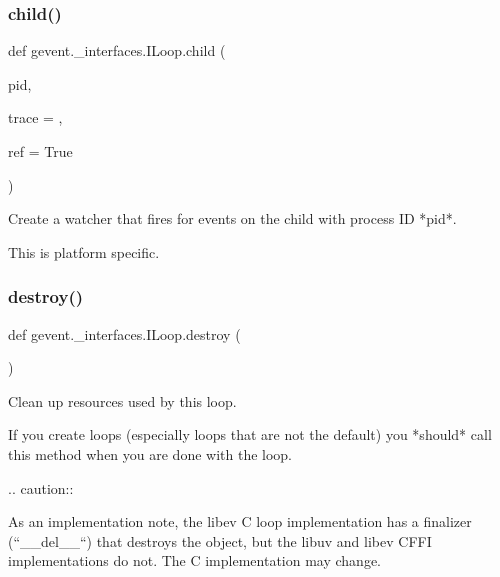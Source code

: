 \subsubsection{\texorpdfstring{child()}{child()}}
{\footnotesize\ttfamily def gevent.\+\_\+interfaces.\+I\+Loop.\+child (\begin{DoxyParamCaption}\item[{}]{pid,  }\item[{}]{trace = {},  }\item[{}]{ref = {\ttfamily True} }\end{DoxyParamCaption})}

\begin{DoxyVerb}Create a watcher that fires for events on the child with process ID *pid*.

This is platform specific.
\end{DoxyVerb}
 \mbox{\label{classgevent_1_1__interfaces_1_1_i_loop_a7cfa09e2e74deecd8bc68891d8334104}} 
\subsubsection{\texorpdfstring{destroy()}{destroy()}}
{\footnotesize\ttfamily def gevent.\+\_\+interfaces.\+I\+Loop.\+destroy (\begin{DoxyParamCaption}{ }\end{DoxyParamCaption})}

\begin{DoxyVerb}Clean up resources used by this loop.

If you create loops
(especially loops that are not the default) you *should* call
this method when you are done with the loop.

.. caution::

    As an implementation note, the libev C loop implementation has a
    finalizer (``__del__``) that destroys the object, but the libuv
    and libev CFFI implementations do not. The C implementation may change.\end{DoxyVerb}
 \mbox{\label{classgevent_1_1__interfaces_1_1_i_loop_a74e8e81d3f018814e59d281b1d78d189}} 
